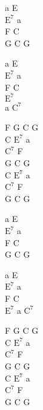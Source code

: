 \begin{chord}
    a E\\
    $\mathrm{E^{7}}$ a\\
    F C\\
    G C G

    a E\\
    $\mathrm{E^{7}}$ a\\
    F C\\
    $\mathrm{E^{7}}$\\
    a $\mathrm{C^{7}}$

    F G C G\\
    C $\mathrm{E^{7}}$ a\\
    $\mathrm{C^{7}}$ F\\
    G C G\\
    C $\mathrm{E^{7}}$ a\\
    $\mathrm{C^{7}}$ F\\
    G C G

    a E\\
    $\mathrm{E^{7}}$ a\\
    F C\\
    G C G

    a E\\
    $\mathrm{E^{7}}$ a\\
    F C\\
    $\mathrm{E^{7}}$ a $\mathrm{C^{7}}$

    F G C G\\
    C $\mathrm{E^{7}}$ a\\
    $\mathrm{C^{7}}$ F\\
    G C G\\
    C $\mathrm{E^{7}}$ a\\
    $\mathrm{C^{7}}$ F\\
    G C G
\end{chord}
